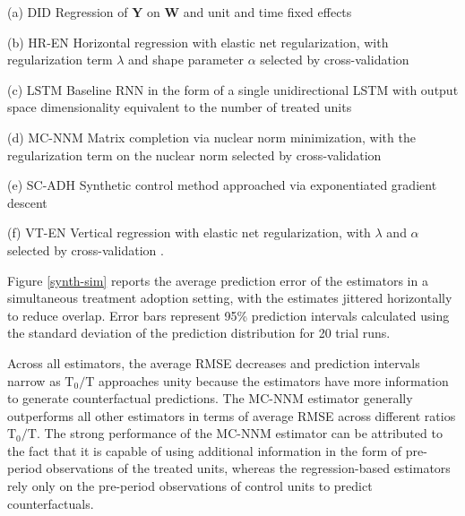 \documentclass[hidelinks,12pt]{article}
\begin{document}
\begin{description}
	\begin{singlespace}
		{\setlength\itemindent{1mm}
			\item[(a) DID] Regression of $\textbf{Y}$ on $\textbf{W}$ and unit and time fixed effects \citep{athey2017matrix}
			\item[(b) HR-EN] Horizontal regression with elastic net regularization, with regularization term $\lambda$ and shape parameter $\alpha$ selected by cross-validation  \citep{athey2017matrix} 
			\item[(c) LSTM] Baseline RNN in the form of a single unidirectional LSTM with output space dimensionality equivalent to the number of treated units
			\item[(d) MC-NNM] Matrix completion via nuclear norm minimization, with the regularization term on the nuclear norm selected by cross-validation \citep{athey2017matrix}
			\item[(e) SC-ADH] Synthetic control method approached via exponentiated gradient descent \citep{abadie2010synthetic}
			\item[(f) VT-EN] Vertical regression with elastic net regularization, with $\lambda$ and $\alpha$ selected by cross-validation \citep{athey2017matrix}.
		}
	\end{singlespace}
\end{description}

Figure \ref{synth-sim} reports the average prediction error of the estimators in a simultaneous treatment adoption setting, with the estimates jittered horizontally to reduce overlap. Error bars represent 95\% prediction intervals calculated using the standard deviation of the prediction distribution for 20 trial runs. 

Across all estimators, the average RMSE decreases and prediction intervals narrow as $\text{T}_0/\text{T}$ approaches unity because the estimators have more information to generate counterfactual predictions. The MC-NNM estimator generally outperforms all other estimators in terms of average RMSE across different ratios $\text{T}_0/\text{T}$.  The strong performance of the MC-NNM estimator can be attributed to the fact that it is capable of using additional information in the form of pre-period observations of the treated units, whereas the regression-based estimators rely only on the pre-period observations of control units to predict counterfactuals. 
\end{document}
